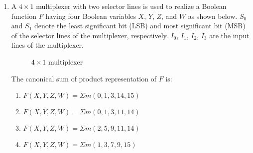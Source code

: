 \documentclass{article}
\begin{document}
\begin{enumerate}
\item A $4 \times 1$ multiplexer with two selector lines is used to realize a Boolean function $F$ having four Boolean variables $X$, $Y$, $Z$, and $W$ as shown below. $S_0$ and $S_1$ denote the least significant bit (LSB) and most significant bit (MSB) of the selector lines of the multiplexer, respectively. $I_0$, $I_1$, $I_2$, $I_3$ are the input lines of the multiplexer.

\begin{figure}[!h]
\begin{center}

\caption{$4\times 1$ multiplexer}
\end{center}
\label{fig:multiplexer}
\end{figure}

The canonical sum of product representation of $F$ is:

\begin{enumerate}[label=(\Alph*)]
  \item $F(X, Y, Z, W) = \Sigma m(0,1,3,14,15)$
  \item $F(X, Y, Z, W) = \Sigma m(0,1,3,11,14)$
  \item $F(X, Y, Z, W) = \Sigma m(2,5,9,11,14)$
  \item $F(X, Y, Z, W) = \Sigma m(1,3,7,9,15)$
\end{enumerate}
\end{enumerate}
\end{document}
